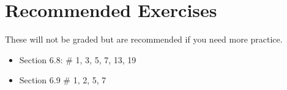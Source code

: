 \documentclass[12pt]{amsart}
\theoremstyle{plain}
\theoremstyle{definition}
\begin{document}
\section{Recommended Exercises}
\noindent These will not be graded but are recommended if you need more practice.
\begin{itemize}
	\item Section 6.8: \# 1, 3, 5, 7, 13, 19
    \item Section 6.9 \# 1, 2, 5, 7
\end{itemize}
	
\end{document}
